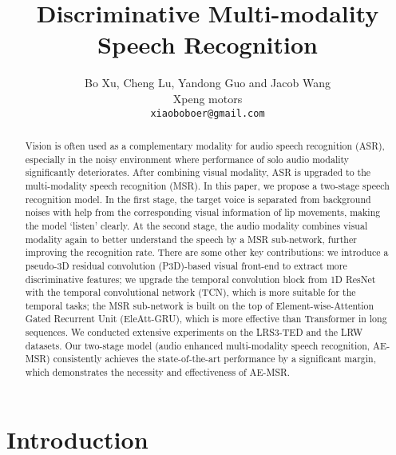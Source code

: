 \documentclass[10pt,twocolumn,letterpaper]{article}
\begin{document}
\title{Discriminative Multi-modality Speech Recognition}

\author{Bo Xu, Cheng Lu, Yandong Guo and Jacob Wang\\
Xpeng motors\\
{\tt\small xiaoboboer@gmail.com}
}

\maketitle
\begin{abstract}
Vision is often used as a complementary modality for audio speech recognition (ASR), especially in the noisy environment where performance of solo audio modality significantly deteriorates. After combining visual modality, ASR is upgraded to the multi-modality speech recognition (MSR). In this paper, we propose a two-stage speech recognition model. In the first stage, the target voice is separated from background noises with help from the corresponding visual information of lip movements, making the model `listen' clearly. At the second stage, the audio modality combines visual modality again to better understand the speech by a MSR sub-network, further improving the recognition rate. There are some other key contributions: we introduce a pseudo-3D residual convolution (P3D)-based visual front-end to extract more discriminative features; we upgrade the temporal convolution block from 1D ResNet with the temporal convolutional network (TCN), which is more suitable for the temporal tasks; the MSR sub-network is built on the top of Element-wise-Attention Gated Recurrent Unit (EleAtt-GRU), which is more effective than Transformer in long sequences. We conducted extensive experiments on the LRS3-TED and the LRW datasets. Our two-stage model (audio enhanced multi-modality speech recognition, AE-MSR) consistently achieves the state-of-the-art performance by a significant margin, which demonstrates the necessity and effectiveness of AE-MSR.
   
\end{abstract}

\section{Introduction}
\end{document}
